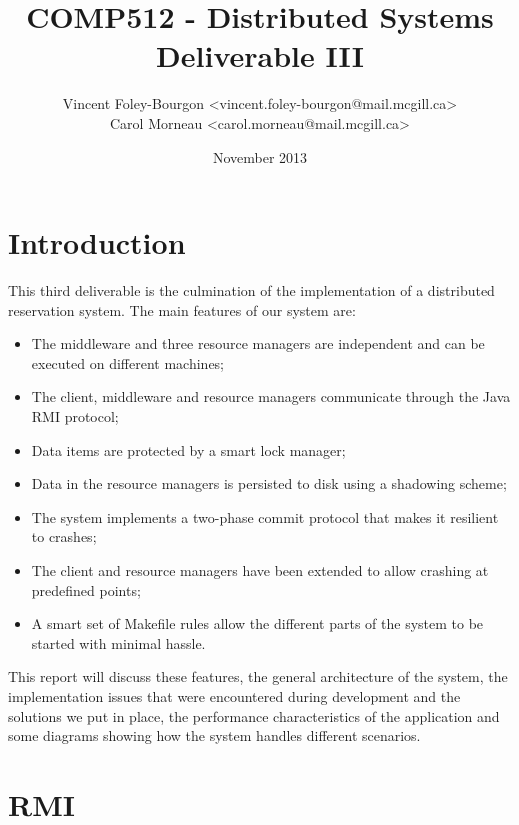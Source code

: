 \documentclass[11pt]{article}
\begin{document}
\title{COMP512 - Distributed Systems \\ Deliverable III}
\author{
  Vincent Foley-Bourgon <vincent.foley-bourgon@mail.mcgill.ca> \\
  Carol Morneau <carol.morneau@mail.mcgill.ca>
}
\date{November 2013}

\maketitle

\tableofcontents

\section{Introduction}

This third deliverable is the culmination of the implementation of a
distributed reservation system.  The main features of our system are:

\begin{itemize}
  \item The middleware and three resource managers are independent and
    can be executed on different machines;
  \item The client, middleware and resource managers communicate
    through the Java RMI protocol;
  \item Data items are protected by a smart lock manager;
  \item Data in the resource managers is persisted to disk using a
    shadowing scheme;
  \item The system implements a two-phase commit protocol that makes
    it resilient to crashes;
  \item The client and resource managers have been extended to allow
    crashing at predefined points;
  \item A smart set of Makefile rules allow the different parts of the
    system to be started with minimal hassle.
\end{itemize}

This report will discuss these features, the general architecture of
the system, the implementation issues that were encountered during
development and the solutions we put in place, the performance
characteristics of the application and some diagrams showing how the
system handles different scenarios.


\section{RMI}
\end{document}
